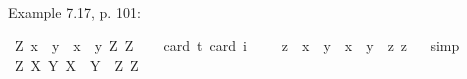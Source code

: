 \begin{isabellebody}
\isadelimproof
\ %
\endisadelimproof
%
\isatagproof
{}\isamarkupfalse%
\ %
%
\endisatagproof
{\isafoldproof}%
%
\isadelimproof
%
\endisadelimproof
%
\begin{isamarkuptext}%
Example 7.17, p. 101:%
\end{isamarkuptext}\isamarkuptrue%
\isamarkupfalse%
\ {\isachardoublequoteopen}{\isasymlfloor}\isactrlbold {\isasymforall}Z{\isacharcolon}{\isacharcolon}{\isasymup}{\isasymzero}{\isachardot}\ {\isacharparenleft}{\isasymlambda}x{\isacharcolon}{\isacharcolon}{\isasymzero}{\isachardot}\ \ \isactrlbold {\isasymbox}{\isacharparenleft}{\isacharparenleft}{\isasymlambda}y{\isacharcolon}{\isacharcolon}{\isasymzero}{\isachardot}\ \ x\ \isactrlbold {\isasymapprox}\ y{\isacharparenright}\ \isactrlbold {\isasymdownharpoonleft}Z{\isacharparenright}{\isacharparenright}\ \isactrlbold {\isasymdownharpoonleft}Z{\isasymrfloor}{\isachardoublequoteclose}\ \isanewline
\ \ \isamarkupfalse%
{\isacharbrackleft}card\ {\isacharprime}t{\isacharequal}{}{\isacharcomma}\ card\ i{\isacharequal}{}{\isacharbrackright}%
\isadelimproof
\ %
\endisadelimproof
%
\isatagproof
{}\isamarkupfalse%
\ %
%
\endisatagproof
{\isafoldproof}%
%
\isadelimproof
%
\endisadelimproof
\isanewline
{}\isamarkupfalse%
\ {\isachardoublequoteopen}{\isasymlfloor}\isactrlbold {\isasymforall}z{\isacharcolon}{\isacharcolon}{\isasymzero}{\isachardot}\ \ {\isacharparenleft}{\isasymlambda}x{\isacharcolon}{\isacharcolon}{\isasymzero}{\isachardot}\ \ \isactrlbold {\isasymbox}{\isacharparenleft}{\isacharparenleft}{\isasymlambda}y{\isacharcolon}{\isacharcolon}{\isasymzero}{\isachardot}\ \ x\ \isactrlbold {\isasymapprox}\ y{\isacharparenright}\ \ z{\isacharparenright}{\isacharparenright}\ z{\isasymrfloor}{\isachardoublequoteclose}%
\isadelimproof
\ %
\endisadelimproof
%
\isatagproof
{}\isamarkupfalse%
\ simp%
\endisatagproof
{\isafoldproof}%
%
\isadelimproof
%
\endisadelimproof
\isanewline
{}\isamarkupfalse%
\ {\isachardoublequoteopen}{\isasymlfloor}\isactrlbold {\isasymforall}Z{\isacharcolon}{\isacharcolon}{\isasymup}{\isasymzero}{\isachardot}\ {\isacharparenleft}{\isasymlambda}X{\isacharcolon}{\isacharcolon}{\isasymup}{\isasymzero}{\isachardot}\ \isactrlbold {\isasymbox}{\isacharparenleft}{\isacharparenleft}{\isasymlambda}Y{\isacharcolon}{\isacharcolon}{\isasymup}{\isasymzero}{\isachardot}\ X\ \isactrlbold {\isasymapprox}\ Y{\isacharparenright}\ \ Z{\isacharparenright}{\isacharparenright}\ Z{\isasymrfloor}{\isachardoublequoteclose}%

\end{isabellebody}
